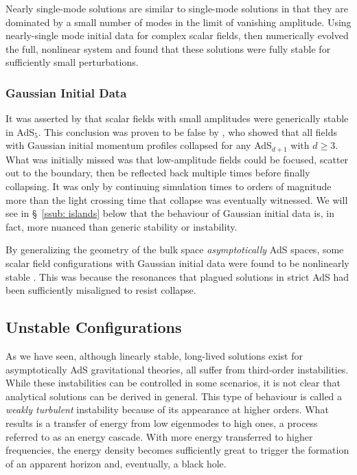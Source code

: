 \documentclass[../PhD.tex]{subfiles}
\begin{document}
Nearly single-mode solutions are similar to single-mode solutions in that they are dominated by a small number of modes in the limit of vanishing amplitude. Using nearly-single mode initial data for complex scalar fields, \cite{1304.4166} then numerically evolved the full, nonlinear system and found that these solutions were fully stable for sufficiently small perturbations.

\subsubsection{Gaussian Initial Data}

It was asserted by \cite{1106.2339} that scalar fields with small amplitudes were generically stable in AdS$_5$. This conclusion was proven to be false by \cite{1108.4539}, who showed that all fields with Gaussian initial momentum profiles collapsed for any AdS$_{d+1}$ with $d \geq 3$. What was initially missed was that low-amplitude fields could be focused, scatter out to the boundary, then be reflected back multiple times before finally collapsing. It was only by continuing simulation times to orders of magnitude more than the light crossing time that collapse was eventually witnessed. We will see in \S~\ref{ssub: islands} below that the behaviour of Gaussian initial data is, in fact, more nuanced than generic stability or instability.

By generalizing the geometry of the bulk space \emph{asymptotically} AdS spaces, some scalar field configurations with Gaussian initial data were found to be nonlinearly stable \cite{1208.5772}. This was because the resonances that plagued solutions in strict AdS had been sufficiently misaligned to resist collapse. 

 
\subsection{Unstable Configurations}
\label{sub: numerical}

As we have seen, although linearly stable, long-lived solutions exist for asymptotically AdS gravitational theories, all suffer from third-order instabilities. While these instabilities can be controlled in some scenarios, it is not clear that analytical solutions can be derived in general. This type of behaviour is called a \emph{weakly turbulent} instability because of its appearance at higher orders. What results is a transfer of energy from low eigenmodes to high ones, a process referred to as an energy cascade. With more energy transferred to higher frequencies, the energy density becomes sufficiently great to trigger the formation of an apparent horizon and, eventually, a black hole.
\end{document}
